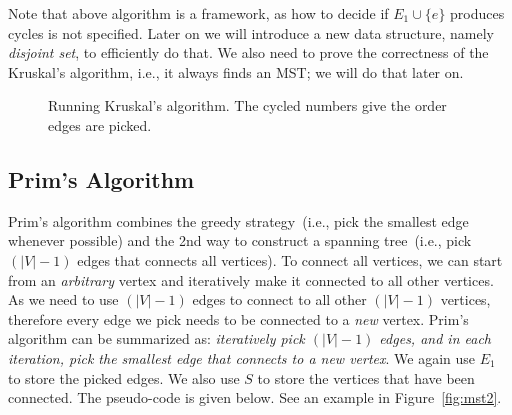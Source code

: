 \begin{minipage}{0.8\textwidth}
	\xxx
	\xxx
	\xxx
	\xxx
	\xxx
	\xxx
	\xxx
	\xxx
	\xxx
	\xxx
\end{minipage}

Note that above algorithm is a framework, as how to decide if $E_1\cup\{e\}$
produces cycles is not specified. Later on we will introduce a new data
structure, namely \emph{disjoint set}, to efficiently do that.
We also need to prove the correctness of the Kruskal's algorithm, i.e.,
it always finds an MST; we will do that later on.

\begin{figure}[h]
\centering{}
\caption{Running Kruskal's algorithm. The cycled numbers give the order edges are picked.}
\label{fig:mst1}
\end{figure}

\subsection*{Prim's Algorithm}

Prim's algorithm combines the greedy strategy~(i.e., pick the smallest edge whenever possible)
and the 2nd way to construct a spanning tree~(i.e., pick $(|V|-1)$ edges that connects all vertices).
To connect all vertices, we can start from an \emph{arbitrary} vertex and iteratively
make it connected to all other vertices. As we need to use $(|V| - 1)$ edges to connect
to all other $(|V|-1)$ vertices, therefore every edge we pick needs to be connected to a
\emph{new} vertex.
Prim's algorithm can be summarized as: \emph{iteratively pick $(|V|-1)$ edges,
and in each iteration, pick the smallest edge that connects to a new vertex}.
We again use $E_1$ to store the picked edges.
We also use $S$ to store the vertices that have been connected.
The pseudo-code is given below.  See an example in Figure~\ref{fig:mst2}.

\begin{minipage}{0.8\textwidth}
	\xxx
	\xxx
	\xxx
	\xxx
	\xxx
	\xxx
	\xxx
	\xxx
	\xxx
\end{minipage}

